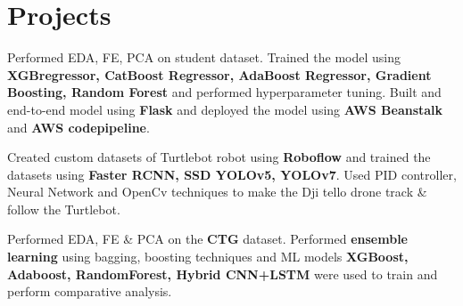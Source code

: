 \documentclass[letterpaper]{deedy-resume} %
\begin{document}
\begin{minipage}[t]{0.66\textwidth}

\vspace{-2.5mm}

\section{Projects}


Performed EDA, FE, PCA on student dataset. Trained the model using \textbf{XGBregressor, CatBoost Regressor, AdaBoost Regressor, Gradient Boosting, Random Forest} and performed hyperparameter tuning. Built and end-to-end model using \textbf{Flask} and deployed the model using \textbf{AWS Beanstalk} and \textbf{AWS codepipeline}.

\sectionspace %



Created custom datasets of Turtlebot robot using \textbf{Roboflow} and trained the datasets using \textbf{Faster RCNN, SSD YOLOv5, YOLOv7}. Used PID controller, Neural Network and OpenCv techniques to make the Dji tello drone track \& follow the Turtlebot.

\sectionspace %



Performed EDA, FE \& PCA on the \textbf{CTG} dataset. Performed \textbf{ensemble learning} using bagging, boosting techniques and ML models \textbf{XGBoost, Adaboost, RandomForest, Hybrid CNN+LSTM} were used to train and perform comparative analysis. 


\end{minipage}
\end{document}
